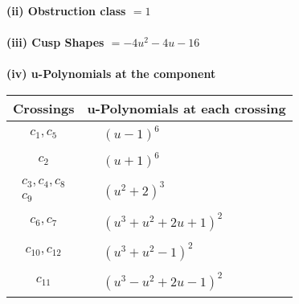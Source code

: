 \documentclass[1p]{elsarticle_modified}
\theoremstyle{definition}
\begin{document}
\flushleft \textbf{(ii) Obstruction class $= 1$}\\~\\
\flushleft \textbf{(iii) Cusp Shapes $= -4 u^2-4 u-16$}\\~\\
\newpage\renewcommand{\arraystretch}{1}
\flushleft \textbf{(iv) u-Polynomials at the component}\newline \\
\begin{tabular}{m{50pt}|m{274pt}}
Crossings & \hspace{64pt}u-Polynomials at each crossing \\
\hline $$\begin{aligned}c_{1},c_{5}\end{aligned}$$&$\begin{aligned}
&(u-1)^6
\end{aligned}$\\
\hline $$\begin{aligned}c_{2}\end{aligned}$$&$\begin{aligned}
&(u+1)^6
\end{aligned}$\\
\hline $$\begin{aligned}c_{3},c_{4},c_{8}\\c_{9}\end{aligned}$$&$\begin{aligned}
&(u^2+2)^3
\end{aligned}$\\
\hline $$\begin{aligned}c_{6},c_{7}\end{aligned}$$&$\begin{aligned}
&(u^3+u^2+2 u+1)^2
\end{aligned}$\\
\hline $$\begin{aligned}c_{10},c_{12}\end{aligned}$$&$\begin{aligned}
&(u^3+u^2-1)^2
\end{aligned}$\\
\hline $$\begin{aligned}c_{11}\end{aligned}$$&$\begin{aligned}
&(u^3- u^2+2 u-1)^2
\end{aligned}$\\
\hline
\end{tabular}\\~\\
\end{document}
